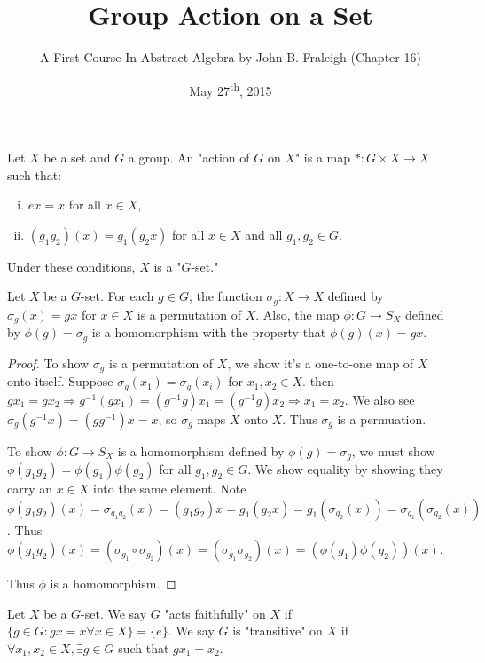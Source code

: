 \documentclass[a4paper,8pt]{article}
\title{Group Action on a Set}
\author{A First Course In Abstract Algebra by John B. Fraleigh (Chapter 16)}
\date{May 27\textsuperscript{th}, 2015}
\begin{document}
\maketitle
{}
\setlength\parindent{24pt}

\begin{outline}

    Let \(X\) be a set and \(G\) a group. An "action of \(G\) on \(X\)" is a map
    \(*: G \times X \rightarrow X\) such that:
    \begin{enumerate}[i.]
      \item \(ex = x\) for all \(x \in X\),
      \item \((g_{1}g_{2})(x) = g_{1}(g_{2}x)\) for all \(x \in X\) and all \(g_{1}, g_{2} \in G\).
    \end{enumerate}
    Under these conditions, \(X\) is a "\(G\)-set."

    Let \(X\) be a \(G\)-set. For each \(g \in G\), the function \(\sigma_{g}: X \rightarrow X\)
    defined by \(\sigma_{g}(x) = gx\) for \(x \in X\) is a permutation of \(X\). Also, the map
    \(\phi: G \rightarrow S_{X}\) defined by \(\phi(g) = \sigma_{g}\) is a homomorphism with the
    property that \(\phi(g)(x) = gx\).

    \begin{proof}
      To show \(\sigma_{g}\) is a permutation of \(X\), we show it's a one-to-one map of \(X\) onto itself. Suppose
      \(\sigma_{g}(x_{1}) = \sigma_{g}(x_{i})\) for \(x_{1}, x_{2} \in X\). then \(gx_{1} = gx_{2} \Rightarrow
      g^{-1}(gx_{1}) = (g^{-1}g)x_{1} = (g^{-1}g)x_{2} \Rightarrow x_{1} = x_{2}\). We also see \(\sigma_{g}(g^{-1}x) =
      (gg^{-1})x = x\), so \(\sigma_{g}\) maps \(X\) onto \(X\). Thus \(\sigma_{g}\) is a permuation.

      To show \(\phi: G \rightarrow S_{X}\) is a homomorphism defined by \(\phi(g) = \sigma_{g}\), we must show
      \(\phi(g_{1}g_{2}) = \phi(g_{1})\phi(g_2)\) for all \(g_1, g_2 \in G\). We show equality by showing they carry an
      \(x \in X\) into the same element. Note \(\phi(g_1g_2)(x) = \sigma_{g_1g_2}(x) = (g_1g_2)x = g_1(g_2x)
      = g_1(\sigma_{g_2}(x)) = \sigma_{g_1}(\sigma_{g_2}(x))\). Thus \(\phi(g_1g_2)(x) =
      (\sigma_{g_1} \circ \sigma_{g_2})(x) = (\sigma_{g_1}\sigma_{g_2})(x) = (\phi(g_1)\phi(g_2))(x)\).

      Thus \(\phi\) is a homomorphism.
    \end{proof}

    Let \(X\) be a \(G\)-set. We say \(G\) "acts faithfully" on \(X\) if \(\{g \in G : gx = x \forall x
    \in X\} = \{e\}\). We say \(G\) is "transitive" on \(X\) if \(\forall x_1, x_2 \in X, \exists g \in G\)
    such that \(gx_1 = x_2\).


\end{outline}
\end{document}
